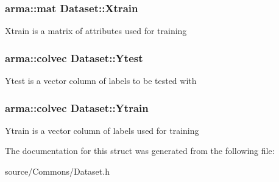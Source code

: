 \subsubsection[{\texorpdfstring{Xtrain}{Xtrain}}]{\setlength{\rightskip}{0pt plus 5cm}arma\+::mat Dataset\+::\+Xtrain}\hypertarget{structDataset_afba2ca3372581ba850149b0a806e15c4}{}\label{structDataset_afba2ca3372581ba850149b0a806e15c4}
Xtrain is a matrix of attributes used for training 
\subsubsection[{\texorpdfstring{Ytest}{Ytest}}]{\setlength{\rightskip}{0pt plus 5cm}arma\+::colvec Dataset\+::\+Ytest}\hypertarget{structDataset_a3b08f5de87d947b3f974d8534048e6be}{}\label{structDataset_a3b08f5de87d947b3f974d8534048e6be}
Ytest is a vector column of labels to be tested with 
\subsubsection[{\texorpdfstring{Ytrain}{Ytrain}}]{\setlength{\rightskip}{0pt plus 5cm}arma\+::colvec Dataset\+::\+Ytrain}\hypertarget{structDataset_ac8226522f944e7f586c9ead2240c8a6b}{}\label{structDataset_ac8226522f944e7f586c9ead2240c8a6b}
Ytrain is a vector column of labels used for training 

The documentation for this struct was generated from the following file\+:\begin{DoxyCompactItemize}
\item 
source/\+Commons/Dataset.\+h\end{DoxyCompactItemize}
